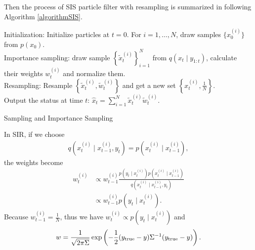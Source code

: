 Then the process of SIS particle filter with resampling is summarized in following Algorithm \ref{algorithmSIS}. 
\begin{algorithm}[h]
\SetAlgoLined 
Initialization: Initialize particles at $t=0$. For $i=1, \ldots, N$, draw samples $\lbrace x_0^{(i)}\rbrace$ from $p(x_0)$.\\
 {Importance sampling: draw sample $\left\lbrace \tilde{x}_t^{(i)}\right\rbrace_{i=1}^N$ from $q(x_t \mid y_{1:t})$, calculate their weights $w_t^{(i)}$ and normalize them. \\
Resampling: Resample $\left\lbrace \tilde{x}_t^{(i)}, \tilde{w}_t^{(i)}\right\rbrace$ and get a new set $\left\lbrace x_t^{(i)},\frac{1}{N}\right\rbrace$.\\
Output the status at time $t$: $\hat{x}_t =\sum_{i=1}^{N}\tilde{x}_t^{(i)}\tilde{w}_t^{(i)}$.}
 \caption{Sampling and Importance Sampling}\label{algorithmSIS}
\end{algorithm}


In SIR, if we choose
\begin{align*}
q\left(x_t^{(i)}\mid x_{t-1}^{(i)},y_t\right) = p\left(x_t^{(i)}\mid x_{t-1}^{(i)}\right),
\end{align*}
the weights become
\begin{align*}
w_t^{(i)}&\propto w_{t-1}^{(i)}\frac{ p\left(y_t \mid x_{t}^{(i)}\right) p\left(x_t^{(i)}\mid x_{t-1}^{(i)}\right)}{q\left(x_t^{(i)}\mid x_{t-1}^{(i)},y_t \right)}\\
&\propto w_{t-1}^{(i)}p\left(y_t \mid x_{t}^{(i)}\right).
\end{align*}
Because $w_{t-1}^{(i)}=\frac{1}{N}$, thus we have $w_t^{(i)} \propto p\left(y_t \mid x_{t}^{(i)}\right)$ and
\begin{align*}
w=\frac{1}{\sqrt{2\pi\Sigma}}\exp\left(-\frac{1}{2} (y_{\mbox{\scriptsize true}}-y)\Sigma^{-1}(y_{\mbox{\scriptsize true}}-y)\right).
\end{align*}

